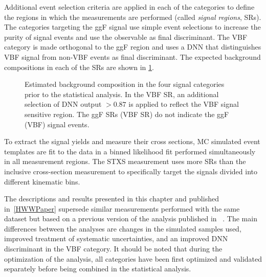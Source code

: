 Additional event selection criteria are applied in each of the categories to define the regions in which the measurements are performed (called \emph{signal regions}, SRs).
The categories targeting the ggF signal use simple event selections to increase the purity of signal events and use the \mT observable as final discriminant. 
The VBF \TwoJet category is made orthogonal to the ggF \TwoJet region and uses a DNN that distinguishes VBF signal from non-VBF events as final discriminant.
The expected background compositions in each of the SRs are shown in \cref{fig:bkg-composition}.
\begin{figure}
     \hfill
    \caption{Estimated background composition in the four signal categories prior to the statistical analysis. In the VBF \TwoJet SR, an additional selection of DNN output $>0.87$ is applied to reflect the VBF signal sensitive region. The ggF SRs (VBF SR) do not indicate the ggF (VBF) signal events.}
    \label{fig:bkg-composition}
\end{figure}
To extract the signal yields and measure their cross sections, MC simulated event templates are fit to the data in a binned 
likelihood fit performed simultaneously in all measurement regions.
The STXS measurement uses more SRs than the inclusive cross-section measurement to specifically target the signals divided into different kinematic bins. 

The descriptions and results presented in this chapter and published in~\cref{HWWPaper} supersede similar measurements performed with the same dataset but based on a previous version of the analysis published in ~.
The main differences between the analyses are changes in the simulated samples used, improved treatment of systematic uncertainties, and an improved DNN discriminant in the VBF category. 
It should be noted that during the optimization of the analysis, all categories have been first optimized and validated separately before being combined in the statistical analysis.



